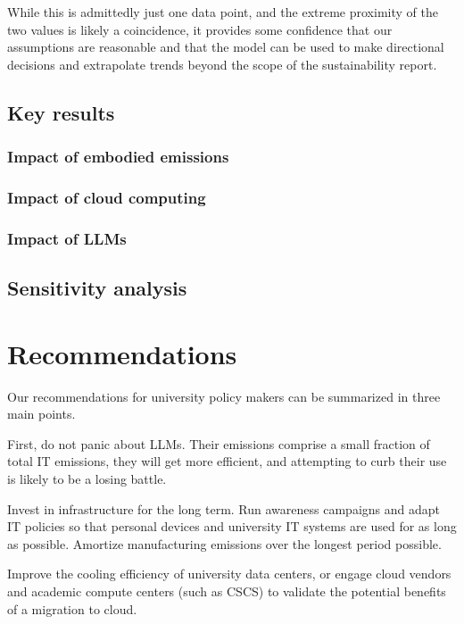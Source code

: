 \documentclass[11pt]{article}
\begin{document}
While this is admittedly just one data point, and the extreme proximity of the two values is likely a coincidence, it provides some confidence that our assumptions are reasonable and that the model can be used to make directional decisions and extrapolate trends beyond the scope of the sustainability report.

\subsection{Key results}

\subsubsection*{Impact of embodied emissions}

\subsubsection*{Impact of cloud computing}

\subsubsection*{Impact of LLMs}

\subsection{Sensitivity analysis}

\section{Recommendations}
\label{sec:recommendations}

Our recommendations for university policy makers can be summarized in three main points.

First, do not panic about LLMs. Their emissions comprise a small fraction of total IT emissions, they will get more efficient, and attempting to curb their use is likely to be a losing battle.

Invest in infrastructure for the long term. Run awareness campaigns and adapt IT policies so that personal devices and university IT systems are used for as long as possible. Amortize manufacturing emissions over the longest period possible.

Improve the cooling efficiency of university data centers, or engage cloud vendors and academic compute centers (such as CSCS) to validate the potential benefits of a migration to cloud.
\end{document}
